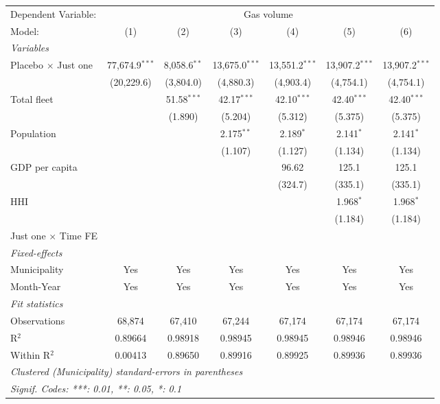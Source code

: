 \documentclass[
]{article}
\begin{document}
\begin{tabular}{lcccccc}
\tabularnewline\midrule\midrule
Dependent Variable:&\multicolumn{6}{c}{Gas volume}\\
Model:&(1) & (2) & (3) & (4) & (5) & (6)\\
\midrule \emph{Variables}&   &   &   &   &   &  \\
Placebo $\times $ Just one & 77,674.9$^{***}$ & 8,058.6$^{**}$ & 13,675.0$^{***}$ & 13,551.2$^{***}$ & 13,907.2$^{***}$ & 13,907.2$^{***}$\\
  &(20,229.6) & (3,804.0) & (4,880.3) & (4,903.4) & (4,754.1) & (4,754.1)\\
Total fleet &    & 51.58$^{***}$ & 42.17$^{***}$ & 42.10$^{***}$ & 42.40$^{***}$ & 42.40$^{***}$\\
  &   & (1.890) & (5.204) & (5.312) & (5.375) & (5.375)\\
Population &    &    & 2.175$^{**}$ & 2.189$^{*}$ & 2.141$^{*}$ & 2.141$^{*}$\\
  &   &    & (1.107) & (1.127) & (1.134) & (1.134)\\
GDP per capita &    &    &    & 96.62 & 125.1 & 125.1\\
  &   &    &    & (324.7) & (335.1) & (335.1)\\
HHI &    &    &    &    & 1.968$^{*}$ & 1.968$^{*}$\\
  &   &    &    &    & (1.184) & (1.184)\\
Just one $\times$ Time FE &  &  &  &  &  & \\
\midrule \emph{Fixed-effects}&   &   &   &   &   &  \\
Municipality & Yes & Yes & Yes & Yes & Yes & Yes\\
Month-Year & Yes & Yes & Yes & Yes & Yes & Yes\\
\midrule \emph{Fit statistics}&  & & & & & \\
Observations & 68,874&67,410&67,244&67,174&67,174&67,174\\
R$^2$ & 0.89664&0.98918&0.98945&0.98945&0.98946&0.98946\\
Within R$^2$ & 0.00413&0.89650&0.89916&0.89925&0.89936&0.89936\\
\midrule\midrule\multicolumn{7}{l}{\emph{Clustered (Municipality) standard-errors in parentheses}}\\
\multicolumn{7}{l}{\emph{Signif. Codes: ***: 0.01, **: 0.05, *: 0.1}}\\
\end{tabular}
\end{document}
